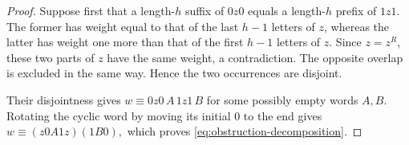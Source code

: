 \documentclass[10pt,a4paper]{amsart}
\begin{document}
\begin{proof}
Suppose first that a length-$h$ suffix of $0z0$ equals a length-$h$
prefix of $1z1$. The former has weight equal to that of the last
$h-1$ letters of $z$, whereas the latter has weight one more than
that of the first $h-1$ letters of $z$. Since $z=z^R$, these two
parts of $z$ have the same weight, a contradiction. The opposite
overlap is excluded in the same way. Hence the two occurrences are
disjoint.

Their disjointness gives
$
w\equiv 0z0\,A\,1z1\,B
$
for some possibly empty words $A,B$. Rotating the cyclic word by
moving its initial $0$ to the end gives
$
w\equiv (z0A1z)(1B0),
$
which proves \eqref{eq:obstruction-decomposition}.
\end{proof}
\end{document}
